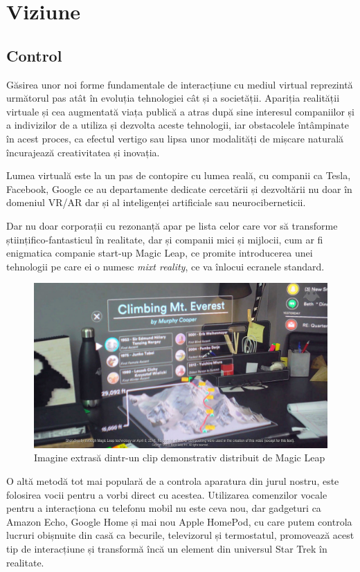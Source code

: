 \chapter {Viziune}

\section{Control}

Găsirea unor noi forme fundamentale de interacțiune cu mediul virtual reprezintă următorul pas atât în evoluția tehnologiei cât și a societății. Apariția realității virtuale și cea augmentată viața publică a atras după sine interesul companiilor și a indivizilor de a utiliza și dezvolta aceste tehnologii, iar obstacolele întâmpinate în acest proces, ca efectul vertigo sau lipsa unor modalități de mișcare naturală încurajează creativitatea și inovația.

Lumea virtuală este la un pas de contopire cu lumea reală, cu companii ca Tesla, Facebook, Google ce au departamente dedicate cercetării și dezvoltării nu doar în domeniul VR/AR dar și al inteligenței artificiale sau neurociberneticii.

Dar nu doar corporații cu rezonanță apar pe lista celor care vor să transforme științifico-fantasticul în realitate, dar și companii mici și mijlocii, cum ar fi enigmatica companie start-up Magic Leap, ce promite introducerea unei tehnologii pe care ei o numesc \textit{mixt reality}, ce va înlocui ecranele standard.

\begin{figure}[h]
  \centering
  \includegraphics[scale=0.27]{img/magicleap.jpg}
  \caption{Imagine extrasă dintr-un clip demonstrativ distribuit de Magic Leap}
\end{figure}

O altă metodă tot mai populară de a controla aparatura din jurul nostru, este folosirea vocii pentru a vorbi direct cu acestea. Utilizarea comenzilor vocale pentru a interacționa cu telefonu mobil nu este ceva nou, dar gadgeturi ca Amazon Echo, Google Home și mai nou Apple HomePod, cu care putem controla lucruri obișnuite din casă ca becurile, televizorul și termostatul, promovează acest tip de interacțiune și transformă încă un element din universul Star Trek în realitate.

